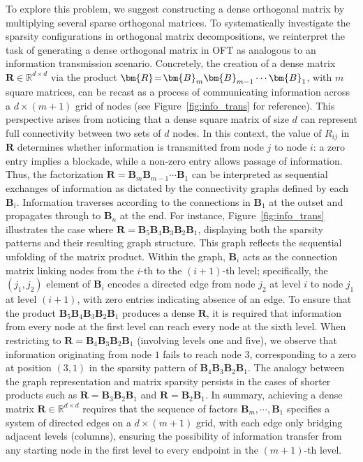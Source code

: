 To explore this problem, we suggest constructing a dense orthogonal matrix by multiplying several sparse orthogonal matrices. To systematically investigate the sparsity configurations in orthogonal matrix decompositions, we reinterpret the task of generating a dense orthogonal matrix in OFT as analogous to an information transmission scenario. Concretely, the creation of a dense matrix $\bm{R}\in\mathbb{R}^{d\times d}$ via the product $\thickmuskip=2mu \medmuskip=2mu \bm{R}=\bm{B}_m\bm{B}_{m-1}\cdots\bm{B}_1$, with $m$ square matrices, can be recast as a process of communicating information across a $d\times (m+1)$ grid of nodes (see Figure~\ref{fig:info_trans} for reference). This perspective arises from noticing that a dense square matrix of size $d$ can represent full connectivity between two sets of $d$ nodes. In this context, the value of $R_{ij}$ in $\bm{R}$ determines whether information is transmitted from node $j$ to node $i$: a zero entry implies a blockade, while a non-zero entry allows passage of information. Thus, the factorization $\bm{R} = \bm{B}_m \bm{B}_{m-1}\cdots \bm{B}_1$ can be interpreted as sequential exchanges of information as dictated by the connectivity graphs defined by each $\bm{B}_i$. Information traverses according to the connections in $\bm{B}_1$ at the outset and propagates through to $\bm{B}_n$ at the end. For instance, Figure~\ref{fig:info_trans} illustrates the case where $\bm{R} = \bm{B}_5\bm{B}_4\bm{B}_3\bm{B}_2\bm{B}_1$, displaying both the sparsity patterns and their resulting graph structure. This graph reflects the sequential unfolding of the matrix product. Within the graph, $\bm{B}_i$ acts as the connection matrix linking nodes from the $i$-th to the $(i+1)$-th level; specifically, the $(j_1, j_2)$ element of $\bm{B}_i$ encodes a directed edge from node $j_2$ at level $i$ to node $j_1$ at level $(i+1)$, with zero entries indicating absence of an edge. To ensure that the product $\bm{B}_5\bm{B}_4\bm{B}_3\bm{B}_2\bm{B}_1$ produces a dense $\bm{R}$, it is required that information from every node at the first level can reach every node at the sixth level. When restricting to $\bm{R} = \bm{B}_4\bm{B}_3\bm{B}_2\bm{B}_1$ (involving levels one and five), we observe that information originating from node $1$ fails to reach node $3$, corresponding to a zero at position $(3,1)$ in the sparsity pattern of $\bm{B}_4\bm{B}_3\bm{B}_2\bm{B}_1$. The analogy between the graph representation and matrix sparsity persists in the cases of shorter products such as $\bm{R} = \bm{B}_3\bm{B}_2\bm{B}_1$ and $\bm{R} = \bm{B}_2\bm{B}_1$. In summary, achieving a dense matrix $\bm{R}\in\mathbb{R}^{d\times d}$ requires that the sequence of factors $\bm{B}_m, \cdots, \bm{B}_1$ specifies a system of directed edges on a $d\times (m+1)$ grid, with each edge only bridging adjacent levels (columns), ensuring the possibility of information transfer from any starting node in the first level to every endpoint in the $(m+1)$-th level.

